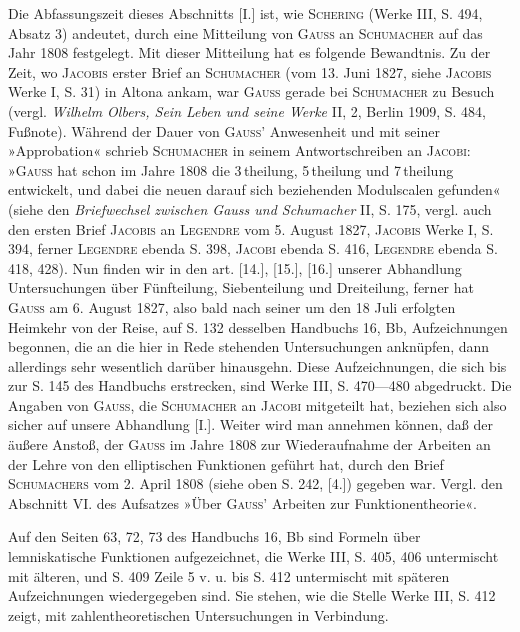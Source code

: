 \par\indent Die Abfassungszeit dieses Abschnitts [I.] ist, wie \textsc{Schering} (Werke III, S. 494, Absatz 3) andeutet, durch eine Mitteilung von \textsc{Gauss} an \textsc{Schumacher} auf das Jahr 1808 festgelegt. Mit dieser Mitteilung hat es folgende Bewandtnis. Zu der Zeit, wo \textsc{Jacobis} erster Brief an \textsc{Schumacher} (vom 13. Juni 1827, siehe \textsc{Jacobis} Werke I, S. 31) in Altona ankam, war \textsc{Gauss} gerade bei \textsc{Schumacher} zu Besuch (vergl. \textit{Wilhelm Olbers, Sein Leben und seine Werke} II, 2, Berlin 1909, S. 484, Fußnote). Während der Dauer von \textsc{Gauss}’ Anwesenheit und mit seiner »Approbation« schrieb \textsc{Schumacher} in seinem Antwortschreiben an \textsc{Jacobi}: »\textsc{Gauss} hat schon im Jahre 1808 die 3\,theilung, 5\,theilung und 7\,theilung entwickelt, und dabei die neuen darauf sich beziehenden Modulscalen gefunden« (siehe den \textit{Briefwechsel zwischen Gauss und Schumacher} II, S. 175, vergl. auch den ersten Brief \textsc{Jacobis} an \textsc{Legendre} vom 5. August 1827, \textsc{Jacobis} Werke I, S. 394, ferner \textsc{Legendre} ebenda S. 398, \textsc{Jacobi} ebenda S. 416, \textsc{Legendre} ebenda S. 418, 428). Nun finden wir in den art. [14.], [15.], [16.] unserer Abhandlung Untersuchungen über Fünfteilung, Siebenteilung und Dreiteilung, ferner hat \textsc{Gauss} am 6. August 1827, also bald nach seiner um den 18 Juli erfolgten Heimkehr von der Reise, auf S. 132 desselben Handbuchs 16, Bb, Aufzeichnungen begonnen, die an die hier in Rede stehenden Untersuchungen anknüpfen, dann allerdings sehr wesentlich darüber hinausgehn. Diese Aufzeichnungen, die sich bis zur S. 145 des Handbuchs erstrecken, sind Werke III, S. 470---480 abgedruckt. Die Angaben von \textsc{Gauss}, die \textsc{Schumacher} an \textsc{Jacobi} mitgeteilt hat, beziehen sich also sicher auf unsere Abhandlung [I.]. Weiter wird man annehmen können, daß der äußere Anstoß, der \textsc{Gauss} im Jahre 1808 zur Wiederaufnahme der Arbeiten an der Lehre von den elliptischen Funktionen geführt hat, durch den Brief \textsc{Schumachers} vom 2. April 1808 (siehe oben S. 242, [4.]) gegeben war. Vergl. den Abschnitt VI. des Aufsatzes »Über \textsc{Gauss}’ Arbeiten zur Funktionentheorie«.
\par\indent Auf den Seiten 63, 72, 73 des Handbuchs 16, Bb sind Formeln über lemniskatische Funktionen aufgezeichnet, die Werke III, S. 405, 406 untermischt mit älteren, und S. 409 Zeile 5 v. u. bis S. 412 untermischt mit späteren Aufzeichnungen wiedergegeben sind. Sie stehen, wie die Stelle Werke III, S. 412 zeigt, mit zahlentheoretischen Untersuchungen in Verbindung.
